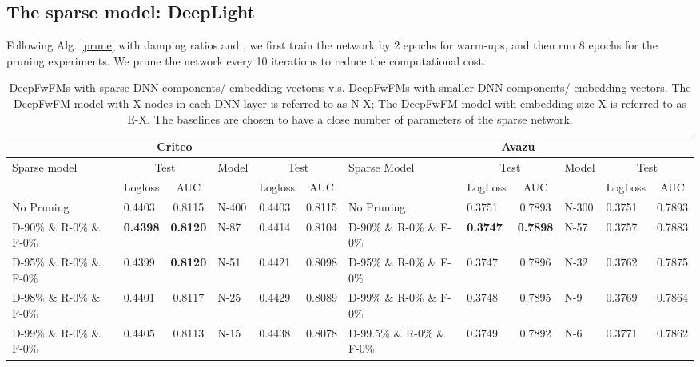 \documentclass[sigconf]{acmart}
\begin{document}
\subsection{The sparse model: DeepLight}
\label{prune_exp}



Following Alg. \ref{prune} with damping ratios  and , we first train the network by 2 epochs for warm-ups, and then run 8 epochs for the pruning experiments. We prune the network every 10 iterations to reduce the computational cost. 


\begin{table*}
 \caption{DeepFwFMs with sparse DNN components/ embedding vectorss v.s. DeepFwFMs with smaller DNN components/ embedding vectors. The DeepFwFM model with X nodes in each DNN layer is referred to as N-X; The DeepFwFM model with embedding size X is referred to as E-X. The baselines are chosen to have a close number of parameters of the sparse network.}
  \centering
  \small
  \begin{tabular}{llc|llc||llc|llc}
    \toprule
    \multicolumn{6}{c||}{Criteo} & \multicolumn{6}{c}{Avazu} \\
    \midrule
    \multirow{2}{*}{Sparse model}  & \multicolumn{2}{c|}{Test} & \multirow{2}{*}{Model} & \multicolumn{2}{c||}{Test} & \multirow{2}{*}{Sparse Model}  & \multicolumn{2}{c|}{Test} & \multirow{2}{*}{Model} & \multicolumn{2}{c}{Test} \\
     & Logloss     & AUC & &  Logloss     & AUC &  & LogLoss     & AUC & &  LogLoss     & AUC\\
    \midrule
    No Pruning   &  0.4403  & 0.8115 & N-400 & 0.4403 & 0.8115 &  No Pruning &   0.3751 & 0.7893   & N-300 &   0.3751 & 0.7893   \\
    \midrule
     D-90\% \& R-0\% \& F-0\%  &  \textbf{0.4398}  & \textbf{{0.8120}}  & N-87 & 0.4414 & 0.8104 & D-90\% \& R-0\% \& F-0\% &  \textbf{0.3747} & \textbf{0.7898}  & N-57 &   0.3757 & 0.7883  \\
     D-95\% \& R-0\% \& F-0\%  &  0.4399  & \textbf{{0.8120}}  & N-51 & 0.4421 & 0.8098 & D-95\% \& R-0\% \& F-0\% &  0.3747 & 0.7896  & N-32 &   0.3762 & 0.7875  \\
     D-98\% \& R-0\% \& F-0\% &  0.4401  & 0.8117  & N-25 &  0.4429 & 0.8089  & D-99\% \& R-0\% \& F-0\% &  0.3748 & 0.7895  & N-9 &  0.3769 & 0.7864   \\
     D-99\% \& R-0\% \& F-0\% &  0.4405  & 0.8113 & N-15 & 0.4438 & 0.8078 & D-99.5\% \& R-0\% \& F-0\% &  0.3749 & 0.7892 & N-6 &   0.3771 & 0.7862   \\

\end{tabular}
\end{table*}
\end{document}
